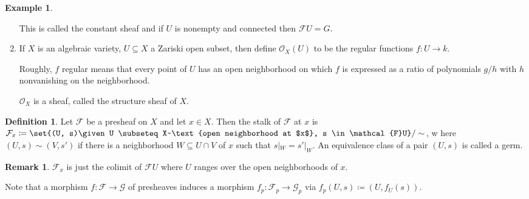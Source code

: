 \documentclass[a4paper]{amsbook}
\theoremstyle{definition}
\newtheorem{definition}{Definition}[chapter]
\newtheorem*{remark*}{Remark}
\newtheorem*{example*}{Example}
\begin{document}
\begin{example*}
\begin{enumerate}
		This is called the constant sheaf and if $U$ is nonempty and connected then
		$\mathcal{F}U = G$.

	\item If $X$ is an algebraic variety, $U \subseteq X$ a Zariski open subset, then
		define $\mathcal{O}_X(U)$ to be the regular functions $f\colon U\to k$.

		Roughly, $f$ regular means that every point of $U$ has an open neighborhood
		on which $f$ is expressed as a ratio of polynomials $g/h$ with $h$
		nonvanishing on the neighborhood.

		$\mathcal{O}_X$ is a sheaf, called the structure sheaf of $X$.
\end{enumerate}
\end{example*}

\begin{definition}
\label{Stalk}
Let $\mathcal{F}$ be a presheaf on $X$ and  let $x \in X$. Then the stalk of
$\mathcal{F}$ at $x$ is $\mathcal{F}_x\coloneqq\set{(U, s)\given U \subseteq X~\text{open neighborhood at $x$}, s \in \mathcal{F}U}/\sim$,
w here $(U, s)\sim (V, s')$ if there is a neighborhood $W \subseteq U\cap V$ of $x$ such that
$s|_W = s'|_W$. An equivalence class of a pair $(U, s)$ is called a germ.
\end{definition}

\begin{remark*}
\label{SheafCategorically}
$\mathcal{F}_x$ is just the colimit of $\mathcal{F}U$ where $U$ ranges over the
open neighborhoods of $x$.

Note that a morphism $f\colon \mathcal{F}\to \mathcal{G}$ of presheaves induces a morphism
$f_p\colon \mathcal{F}_p\to \mathcal{G}_p$ via $f_p(U, s)\coloneqq (U, f_U(s))$.
\end{remark*}
\end{document}
